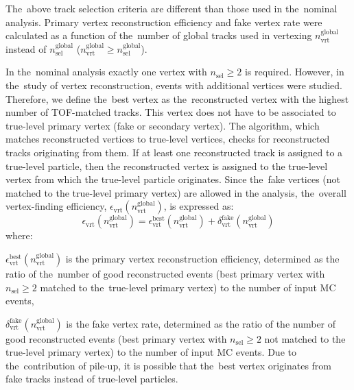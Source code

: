 The~above track selection criteria are different than those used in the~nominal analysis. Primary vertex reconstruction efficiency and fake vertex rate were calculated as a function of the~number of global tracks used in vertexing $n^\textrm{global}_\textrm{vrt}$ instead of $n^\textrm{global}_\textrm{sel}$ ($n^\textrm{global}_\textrm{vrt}\geq n^\textrm{global}_\textrm{sel}$). 



In the~nominal analysis exactly one vertex with $n_\textrm{sel}\geq 2$ is required.  However, in the~study of vertex reconstruction, events with additional vertices were studied. Therefore, we define the~best vertex as the~reconstructed vertex with the highest number of TOF-matched tracks. This vertex does not have to be associated to true-level primary vertex (fake or secondary vertex). The algorithm, which matches reconstructed vertices to true-level vertices,  checks for reconstructed tracks originating from them. If at least one reconstructed track  is assigned to a true-level particle, then the reconstructed vertex is assigned to the true-level vertex from which the true-level particle originates. Since the~fake vertices (not matched to the true-level primary vertex) are allowed in the analysis, the~overall vertex-finding efficiency, $\epsilon_\textrm{vrt}\left(n_\textrm{vrt}^\textrm{global}\right)$, is expressed as:
\begin{equation}
\epsilon_\textrm{vrt}\left(n_\textrm{vrt}^\textrm{global}\right)=\epsilon_\textrm{vrt}^\textrm{best}\left(n_\textrm{vrt}^\textrm{global}\right)+\delta_\textrm{vrt}^\textrm{fake}\left(n_\textrm{vrt}^\textrm{global}\right)
\end{equation}
where:
\begin{description}
	\item $\epsilon_\textrm{vrt}^\textrm{best}\left(n_\textrm{vrt}^\textrm{global}\right)$ is the primary vertex reconstruction efficiency, determined as the ratio of the~number of good reconstructed events (best primary vertex with $n_\textrm{sel}\geq 2$ matched to the~true-level primary vertex) to the number of input MC events,
	\item $\delta_\textrm{vrt}^\textrm{fake}\left(n_\textrm{vrt}^\textrm{global}\right)$ is the fake vertex rate, determined as the ratio of the number of good reconstructed events (best primary vertex with $n_\textrm{sel}\geq 2$  not matched to the true-level primary vertex) to the number of input MC events. Due to the~contribution of pile-up, it is possible that the~best vertex originates from fake tracks instead of true-level particles.
\end{description}
